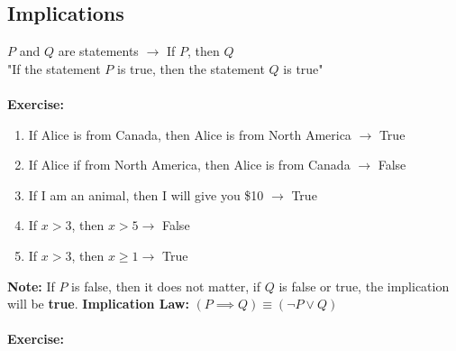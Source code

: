 \documentclass[10pt]{article}
\theoremstyle{break}
\begin{document}
\subsection{Implications}
$P$ and $Q$ are statements $\to$ If $P$, then $Q$\\
"If the statement $P$ is true, then the statement $Q$ is true"\\ \: \\
\textbf{Exercise:}
\begin{enumerate}
    \item If Alice is from Canada, then Alice is from North America $\to$ True
    \item If Alice if from North America, then Alice is from Canada $\to$ False
    \item If I am an animal, then I will give you \${10} $\to$ True
    \item If $x > 3$, then $x > 5 \to$ False
    \item If $x > 3$, then $x \ge 1 \to$ True 
\end{enumerate}
\textbf{Note:} If $P$ is false, then it does not matter, if $Q$ is false or true, the implication will be \textbf{true}.
\textbf{Implication Law: } $(P \implies Q) \equiv (\neg P \vee Q)$\\ \: \\
\textbf{Exercise:}
\end{document}
